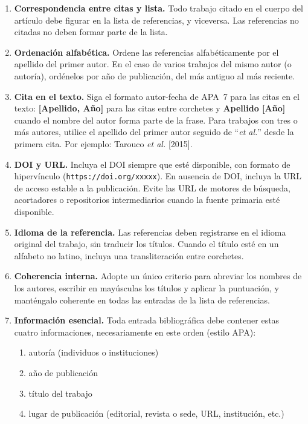 \documentclass[spanish]{rbie2026}%
\begin{document}
\begin{enumerate}
  \item \textbf{Correspondencia entre citas y lista.} Todo trabajo citado en el cuerpo del artículo debe figurar en la lista de referencias, y viceversa. Las referencias no citadas no deben formar parte de la lista.

  \item \textbf{Ordenación alfabética.} Ordene las referencias alfabéticamente por el apellido del primer autor. En el caso de varios trabajos del mismo autor (o autoría), ordénelos por año de publicación, del más antiguo al más reciente.

  \item \textbf{Cita en el texto.} Siga el formato autor-fecha de APA~7 para las citas en el texto: \textbf{[Apellido, Año]} para las citas entre corchetes y \textbf{Apellido [Año]} cuando el nombre del autor forma parte de la frase. Para trabajos con tres o más autores, utilice el apellido del primer autor seguido de ``\textit{et al.}'' desde la primera cita. Por ejemplo: Tarouco \textit{et al.} [2015].

  \item \textbf{DOI y URL.} Incluya el DOI siempre que esté disponible, con formato de hipervínculo (\texttt{https://doi.org/xxxxx}). En ausencia de DOI, incluya la URL de acceso estable a la publicación. Evite las URL de motores de búsqueda, acortadores o repositorios intermediarios cuando la fuente primaria esté disponible.

  \item \textbf{Idioma de la referencia.} Las referencias deben registrarse en el idioma original del trabajo, sin traducir los títulos. Cuando el título esté en un alfabeto no latino, incluya una transliteración entre corchetes.

  \item \textbf{Coherencia interna.} Adopte un único criterio para abreviar los nombres de los autores, escribir en mayúsculas los títulos y aplicar la puntuación, y manténgalo coherente en todas las entradas de la lista de referencias.

   \item \textbf{Información esencial.} Toda entrada bibliográfica debe contener estas cuatro informaciones, necesariamente en este orden (estilo APA):

   \begin{enumerate}
       \item autoría (individuos o instituciones)
       \item año de publicación
       \item título del trabajo
       \item lugar de publicación (editorial, revista o sede, URL, institución, etc.)
   \end{enumerate}
\end{enumerate}
\end{document}
